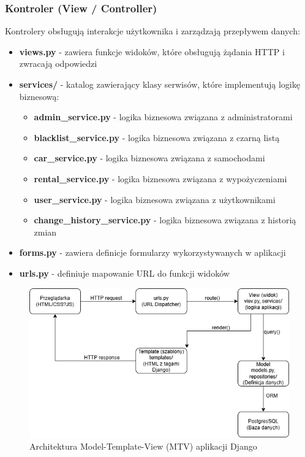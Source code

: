 \documentclass[12pt,a4paper]{article}
\begin{document}
\newpage

\subsubsection{Kontroler (View / Controller)}
Kontrolery obsługują interakcje użytkownika i zarządzają przepływem danych:
\begin{itemize}
    \item \textbf{views.py} - zawiera funkcje widoków, które obsługują żądania HTTP i zwracają odpowiedzi
    \item \textbf{services/} - katalog zawierający klasy serwisów, które implementują logikę biznesową:
    \begin{itemize}
        \item \textbf{admin\_service.py} - logika biznesowa związana z administratorami
        \item \textbf{blacklist\_service.py} - logika biznesowa związana z czarną listą
        \item \textbf{car\_service.py} - logika biznesowa związana z samochodami
        \item \textbf{rental\_service.py} - logika biznesowa związana z wypożyczeniami
        \item \textbf{user\_service.py} - logika biznesowa związana z użytkownikami
        \item \textbf{change\_history\_service.py} - logika biznesowa związana z historią zmian
    \end{itemize}
    \item \textbf{forms.py} - zawiera definicje formularzy wykorzystywanych w aplikacji
    \item \textbf{urls.py} - definiuje mapowanie URL do funkcji widoków
\end{itemize}

\begin{figure}[H]
    \centering
    \includegraphics[width=1\textwidth]{diagram_mvc.png}
    \caption{Architektura Model-Template-View (MTV) aplikacji Django}
    \label{fig:mtv-architecture}
\end{figure}
\end{document}
